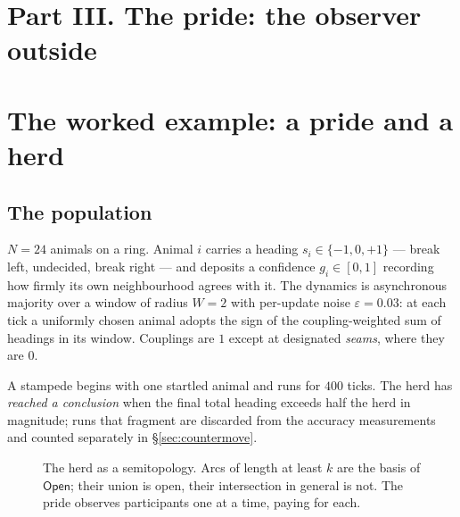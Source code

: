 \documentclass[11pt,a4paper]{article}
\theoremstyle{plain}
\theoremstyle{definition}
\theoremstyle{remark}
\newcommand{\Open}{\mathsf{Open}}
\begin{document}
\section*{Part III. The pride: the observer outside}

\section{The worked example: a pride and a herd}\label{sec:worked}

\subsection{The population}

$N = 24$ animals on a ring. Animal $i$ carries a heading
$s_i \in \{-1, 0, +1\}$ --- break left, undecided, break right --- and deposits
a confidence $g_i \in [0,1]$ recording how firmly its own neighbourhood agrees
with it. The dynamics is asynchronous majority over a window of radius $W = 2$
with per-update noise $\varepsilon = 0.03$: at each tick a uniformly chosen
animal adopts the sign of the coupling-weighted sum of headings in its window.
Couplings are $1$ except at designated \emph{seams}, where they are $0$.

A stampede begins with one startled animal and runs for $400$ ticks. The herd
has \emph{reached a conclusion} when the final total heading exceeds half the
herd in magnitude; runs that fragment are discarded from the accuracy
measurements and counted separately in \S\ref{sec:countermove}.

\begin{figure}[t]
\centering
{}
\caption{The herd as a semitopology. Arcs of length at least $k$ are the basis
of $\Open$; their union is open, their intersection in general is not. The
pride observes participants one at a time, paying for each.}
\label{fig:ring}
\end{figure}
\end{document}
